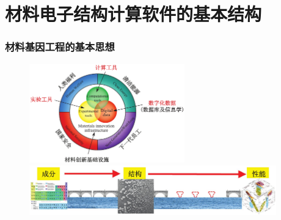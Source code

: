 \documentclass[cjk,slidestop,compress,mathserif,blue]{beamer}
\begin{document}

\subject{}
\frame
{
\titlepage
}

\section*{}

\small
\section{材料电子结构计算软件的基本结构}       %
\frame
{
	\frametitle{材料基因工程的基本思想}
\begin{figure}[h!]
\centering
\vspace*{-0.2in}
\includegraphics[width=0.6\textwidth]{Figures/Mat_Geno_Ene-1.png}
\vskip 0.10in
\includegraphics[height=0.85in]{Figures/Mat_Geno_Ene-3.png}
\label{Mater_Genome}
\end{figure}
}
\end{document}
